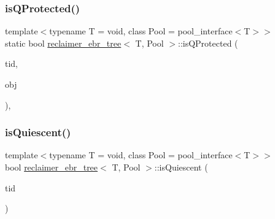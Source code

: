 \mbox{\label{classreclaimer__ebr__tree_a9e2faa5a9d111fcf1c44c1bad0e2c3d2}} 
\subsubsection{\texorpdfstring{is\+Q\+Protected()}{isQProtected()}}
{\footnotesize\ttfamily template$<$typename T  = void, class Pool  = pool\+\_\+interface$<$\+T$>$$>$ \\
static bool \hyperlink{classreclaimer__ebr__tree}{reclaimer\+\_\+ebr\+\_\+tree}$<$ T, Pool $>$\+::is\+Q\+Protected (\begin{DoxyParamCaption}\item[{const int}]{tid,  }\item[{T $\ast$const}]{obj }\end{DoxyParamCaption})\hspace{0.3cm}{\ttfamily [inline]}, {\ttfamily [static]}}

\mbox{\label{classreclaimer__ebr__tree_ad738d298fd4c156af87eaa52e8b67911}} 
\subsubsection{\texorpdfstring{is\+Quiescent()}{isQuiescent()}}
{\footnotesize\ttfamily template$<$typename T  = void, class Pool  = pool\+\_\+interface$<$\+T$>$$>$ \\
bool \hyperlink{classreclaimer__ebr__tree}{reclaimer\+\_\+ebr\+\_\+tree}$<$ T, Pool $>$\+::is\+Quiescent (\begin{DoxyParamCaption}\item[{const int}]{tid }\end{DoxyParamCaption})\hspace{0.3cm}{\ttfamily [inline]}}

\mbox{\label{classreclaimer__ebr__tree_a5ad297478a76719d6d643234ee053e78}} 
